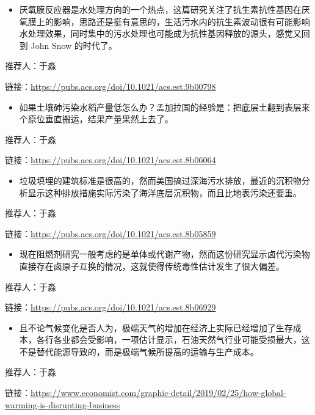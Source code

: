 \documentclass[
]{book}
\providecommand{\tightlist}{%
  \setlength{\itemsep}{0pt}\setlength{\parskip}{0pt}}
\begin{document}
\begin{itemize}
\tightlist
\item
  厌氧膜反应器是水处理方向的一个热点，这篇研究关注了抗生素抗性基因在厌氧膜上的影响，思路还是挺有意思的，生活污水内的抗生素波动很有可能影响水处理效果，同时集中的污水处理也可能成为抗性基因释放的源头，感觉又回到 John Snow 的时代了。
\end{itemize}

推荐人：于淼

链接：\url{https://pubs.acs.org/doi/10.1021/acs.est.9b00798}

\begin{itemize}
\tightlist
\item
  如果土壤砷污染水稻产量低怎么办？孟加拉国的经验是：把底层土翻到表层来个原位垂直搬运，结果产量果然上去了。
\end{itemize}

推荐人：于淼

链接：\url{https://pubs.acs.org/doi/10.1021/acs.est.8b06064}

\begin{itemize}
\tightlist
\item
  垃圾填埋的建筑标准是很高的，然而美国搞过深海污水排放，最近的沉积物分析显示这种排放措施实际污染了海洋底层沉积物，而且比地表污染还要重。
\end{itemize}

推荐人：于淼

链接：\url{https://pubs.acs.org/doi/10.1021/acs.est.8b05859}

\begin{itemize}
\tightlist
\item
  现在阻燃剂研究一般考虑的是单体或代谢产物，然而这份研究显示卤代污染物直接存在卤原子互换的情况，这就使得传统毒性估计发生了很大偏差。
\end{itemize}

推荐人：于淼

链接：\url{https://pubs.acs.org/doi/10.1021/acs.est.8b06929}

\begin{itemize}
\tightlist
\item
  且不论气候变化是否人为，极端天气的增加在经济上实际已经增加了生存成本，各行各业都会受影响，一项估计显示，石油天然气行业可能受损最大，这不是替代能源导致的，而是极端气候所提高的运输与生产成本。
\end{itemize}

推荐人：于淼

链接：\url{https://www.economist.com/graphic-detail/2019/02/25/how-global-warming-is-disrupting-business}
\end{document}

